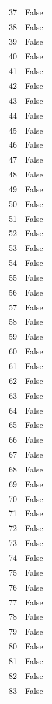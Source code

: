 \documentclass[
  letterpaper,
  DIV=11,
  numbers=noendperiod]{scrreprt}
\begin{document}
\begin{tabular}{ll}
37  &  False \\
38  &  False \\
39  &  False \\
40  &  False \\
41  &  False \\
42  &  False \\
43  &  False \\
44  &  False \\
45  &  False \\
46  &  False \\
47  &  False \\
48  &  False \\
49  &  False \\
50  &  False \\
51  &  False \\
52  &  False \\
53  &  False \\
54  &  False \\
55  &  False \\
56  &  False \\
57  &  False \\
58  &  False \\
59  &  False \\
60  &  False \\
61  &  False \\
62  &  False \\
63  &  False \\
64  &  False \\
65  &  False \\
66  &  False \\
67  &  False \\
68  &  False \\
69  &  False \\
70  &  False \\
71  &  False \\
72  &  False \\
73  &  False \\
74  &  False \\
75  &  False \\
76  &  False \\
77  &  False \\
78  &  False \\
79  &  False \\
80  &  False \\
81  &  False \\
82  &  False \\
83  &  False \\

\end{tabular}
\end{document}
